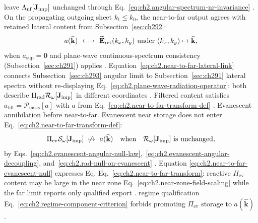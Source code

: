 leave \(\Lambda_{\mathrm{nf}}[\mathbf{J}_{\mathrm{imp}}]\) unchanged through
Eq.~\eqref{eq:ch2.angular-spectrum-nr-invariance} \cite{stratton1941}.
On the propagating outgoing sheet \(k_t\le k_0\), the near-to-far output agrees with retained
lateral content from Subsection~\ref{sec:ch292}:
\begin{equation}
\label{eq:ch2.near-to-far-lateral-link}
a(\widehat{\mathbf{k}})
\ \longleftrightarrow\
\widetilde{\mathbf{E}}_{\mathrm{ret}}(k_x,k_y)
\ \text{under}\ (k_x,k_y)\mapsto\widehat{\mathbf{k}},
\end{equation}
when \(a_{\mathrm{sup}}=\mathbf{0}\) and plane-wave continuous-spectrum consistency (Subsection~\ref{sec:ch291}) applies \cite{stratton1941}.
Equation~\eqref{eq:ch2.near-to-far-lateral-link} connects Subsection~\ref{sec:ch293} angular
limit to Subsection~\ref{sec:ch291} lateral spectra without re-displaying
Eq.~\eqref{eq:ch2.plane-wave-radiation-operator}: both describe
\(\Pi_{\mathrm{rad}}\mathcal{R}_\omega[\mathbf{J}_{\mathrm{imp}}]\) in different coordinates
\cite{stratton1941}. Filtered content satisfies
\(a_{\mathrm{filt}}=\mathcal{P}_{\mathrm{meas}}[a]\) with \(a\) from
Eq.~\eqref{eq:ch2.near-to-far-transform-def} \cite{stratton1941}.
Evanescent annihilation before near-to-far. Evanescent near storage does not enter Eq.~\eqref{eq:ch2.near-to-far-transform-def}:
\begin{equation}
\label{eq:ch2.near-to-far-evanescent-null}
\Pi_{\mathrm{ev}}\mathcal{S}_\omega[\mathbf{J}_{\mathrm{imp}}]
\ \not\mapsto\
a(\widehat{\mathbf{k}})
\quad\text{when}\quad
\mathcal{R}_\omega[\mathbf{J}_{\mathrm{imp}}]\ \text{is unchanged},
\end{equation}
by Eqs.~\eqref{eq:ch2.evanescent-angular-null-law},~\eqref{eq:ch2.evanescent-angular-decoupling},
and~\eqref{eq:ch2.rad-null-on-evanescent} \cite{stratton1941}. Equation
\eqref{eq:ch2.near-to-far-evanescent-null} expresses Eq.
Eq.~\eqref{eq:ch2.near-to-far-transform}: reactive \(\Pi_{\mathrm{ev}}\) content may be
large in the near zone Eq.~\eqref{eq:ch2.near-zone-field-scaling} while the far limit reports
only qualified export \cite{stratton1941}. regime qualification
Eq.~\eqref{eq:ch2.regime-component-criterion} forbids promoting \(\Pi_{\mathrm{ev}}\) storage to
\(a(\widehat{\mathbf{k}})\) \cite{harrington2001}.
